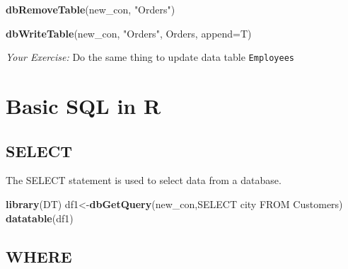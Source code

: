 \documentclass[
]{book}
\newenvironment{Shaded}{\begin{snugshade}}{\end{snugshade}}
\newcommand{\AttributeTok}[1]{\textcolor[rgb]{0.13,0.29,0.53}{#1}}
\newcommand{\FunctionTok}[1]{\textcolor[rgb]{0.13,0.29,0.53}{\textbf{#1}}}
\newcommand{\NormalTok}[1]{#1}
\newcommand{\OtherTok}[1]{\textcolor[rgb]{0.56,0.35,0.01}{#1}}
\newcommand{\SpecialCharTok}[1]{\textcolor[rgb]{0.81,0.36,0.00}{\textbf{#1}}}
\newcommand{\StringTok}[1]{\textcolor[rgb]{0.31,0.60,0.02}{#1}}
\begin{document}
\begin{Shaded}
\begin{Highlighting}[]
\FunctionTok{dbRemoveTable}\NormalTok{(new\_con, }\StringTok{"Orders"}\NormalTok{)}
\end{Highlighting}
\end{Shaded}

\begin{Shaded}
\end{Shaded}

\begin{Shaded}
\begin{Highlighting}[]
\FunctionTok{dbWriteTable}\NormalTok{(new\_con, }\StringTok{"Orders"}\NormalTok{, Orders, }\AttributeTok{append=}\NormalTok{T) }
\end{Highlighting}
\end{Shaded}

\emph{Your Exercise:} Do the same thing to update data table \texttt{Employees}

\hypertarget{basic-sql-in-r}{%
\section{Basic SQL in R}\label{basic-sql-in-r}}

\hypertarget{select}{%
\subsection{SELECT}\label{select}}

The SELECT statement is used to select data from a database.

\begin{Shaded}
\begin{Highlighting}[]
\FunctionTok{library}\NormalTok{(DT)}
\NormalTok{df1}\OtherTok{\textless{}{-}}\FunctionTok{dbGetQuery}\NormalTok{(new\_con,}\StringTok{\textquotesingle{}SELECT city}
\StringTok{                         FROM Customers\textquotesingle{}}\NormalTok{)}
\FunctionTok{datatable}\NormalTok{(df1)}
\end{Highlighting}
\end{Shaded}

\hypertarget{where}{%
\subsection{WHERE}\label{where}}
\end{document}
